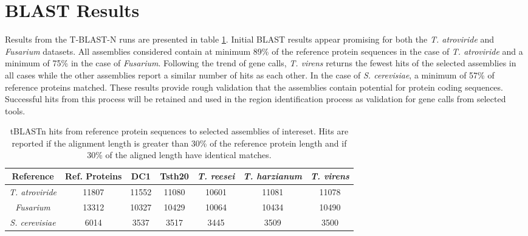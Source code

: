 \section{BLAST Results}
Results from the T-BLAST-N runs are presented in table
\ref{table:tblastn}. Initial BLAST results appear promising for both
the \textit{T. atroviride} and \textit{Fusarium} datasets. All
assemblies considered contain at minimum 89\% of the reference protein
sequences in the case of \textit{T. atroviride} and a minimum of 75\%
in the case of \textit{Fusarium}. Following the trend of gene calls,
\textit{T. virens} returns the fewest hits of the selected assemblies
in all cases while the other assemblies report a similar number of
hits as each other. In the case of \textit{S. cerevisiae}, a minimum
of 57\% of reference proteins matched. These results provide rough
validation that the assemblies contain potential for protein coding
sequences. Successful hits from this process will be retained and used
in the region identification process as validation for gene calls from
selected tools.


\begin{table}
  \centering
  \begin{tabular}{|c|c|c|c|c|c|c|}
    \hline
    Reference & Ref. Proteins & DC1 & Tsth20 & \textit{T. reesei} & \textit{T. harzianum} & \textit{T. virens}  \\ \hline
    \textit{T. atroviride} & 11807 & 11552 & 11080 & 10601 & 11081 & 11078 \\ \hline 
    \textit{Fusarium} & 13312 & 10327 & 10429 & 10064 & 10434 & 10490 \\ \hline
    \textit{S. cerevisiae} & 6014 & 3537 & 3517 & 3445 & 3509 & 3500 \\ \hline
  \end{tabular}
  \caption{tBLASTn hits from reference protein sequences to selected
    assemblies of intereset. Hits are reported if the alignment length
    is greater than 30\% of the reference protein length and if 30\%
    of the aligned length have identical matches.}
  \label{table:tblastn}
\end{table}
